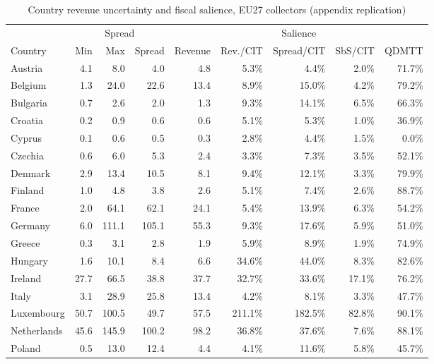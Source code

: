 \begin{table}[H]
\centering
\scriptsize
\setlength{\tabcolsep}{2pt}
\caption[Country revenue uncertainty and fiscal salience, EU27 collectors]{Country revenue uncertainty and fiscal salience, EU27 collectors (appendix replication)}
\label{tab:app_country_revenue_diagnostic}
\begin{adjustbox}{max width=\textwidth,center}
\begin{tabular}{@{}l rrr r rrrr@{}}
\toprule
 & \multicolumn{3}{c}{Spread} & \multicolumn{5}{c}{Salience} \\
\cmidrule(lr){2-4} \cmidrule(lr){5-9}
Country & Min & Max & Spread & Revenue & Rev./CIT & Spread/CIT & SbS/CIT & QDMTT \\
\midrule
Austria & 4.1 & 8.0 & 4.0 & 4.8 & 5.3\% & 4.4\% & 2.0\% & 71.7\% \\
Belgium & 1.3 & 24.0 & 22.6 & 13.4 & 8.9\% & 15.0\% & 4.2\% & 79.2\% \\
Bulgaria & 0.7 & 2.6 & 2.0 & 1.3 & 9.3\% & 14.1\% & 6.5\% & 66.3\% \\
Croatia & 0.2 & 0.9 & 0.6 & 0.6 & 5.1\% & 5.3\% & 1.0\% & 36.9\% \\
Cyprus & 0.1 & 0.6 & 0.5 & 0.3 & 2.8\% & 4.4\% & 1.5\% & 0.0\% \\
Czechia & 0.6 & 6.0 & 5.3 & 2.4 & 3.3\% & 7.3\% & 3.5\% & 52.1\% \\
Denmark & 2.9 & 13.4 & 10.5 & 8.1 & 9.4\% & 12.1\% & 3.3\% & 79.9\% \\
Finland & 1.0 & 4.8 & 3.8 & 2.6 & 5.1\% & 7.4\% & 2.6\% & 88.7\% \\
France & 2.0 & 64.1 & 62.1 & 24.1 & 5.4\% & 13.9\% & 6.3\% & 54.2\% \\
Germany & 6.0 & 111.1 & 105.1 & 55.3 & 9.3\% & 17.6\% & 5.9\% & 51.0\% \\
Greece & 0.3 & 3.1 & 2.8 & 1.9 & 5.9\% & 8.9\% & 1.9\% & 74.9\% \\
Hungary & 1.6 & 10.1 & 8.4 & 6.6 & 34.6\% & 44.0\% & 8.3\% & 82.6\% \\
Ireland & 27.7 & 66.5 & 38.8 & 37.7 & 32.7\% & 33.6\% & 17.1\% & 76.2\% \\
Italy & 3.1 & 28.9 & 25.8 & 13.4 & 4.2\% & 8.1\% & 3.3\% & 47.7\% \\
Luxembourg & 50.7 & 100.5 & 49.7 & 57.5 & 211.1\% & 182.5\% & 82.8\% & 90.1\% \\
Netherlands & 45.6 & 145.9 & 100.2 & 98.2 & 36.8\% & 37.6\% & 7.6\% & 88.1\% \\
Poland & 0.5 & 13.0 & 12.4 & 4.4 & 4.1\% & 11.6\% & 5.8\% & 45.7\% \\

\end{tabular}
\end{adjustbox}
\end{table}
